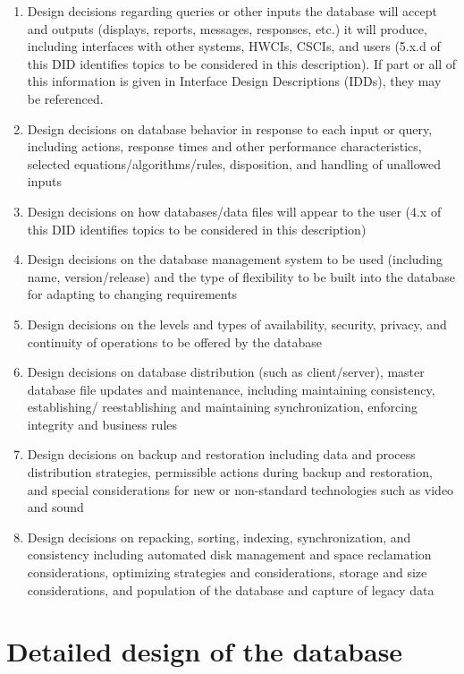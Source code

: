 \begin{enumerate}
\itemsep1pt\parskip0pt
\item
  Design decisions regarding queries or other inputs the database will
  accept and outputs (displays, reports, messages, responses, etc.) it
  will produce, including interfaces with other systems, HWCIs, CSCIs,
  and users (5.x.d of this DID identifies topics to be considered in
  this description). If part or all of this information is given in
  Interface Design Descriptions (IDDs), they may be referenced.
\item
  Design decisions on database behavior in response to each input or
  query, including actions, response times and other performance
  characteristics, selected equations/algorithms/rules, disposition, and
  handling of unallowed inputs
\item
  Design decisions on how databases/data files will appear to the user
  (4.x of this DID identifies topics to be considered in this
  description)
\item
  Design decisions on the database management system to be used
  (including name, version/release) and the type of flexibility to be
  built into the database for adapting to changing requirements
\item
  Design decisions on the levels and types of availability, security,
  privacy, and continuity of operations to be offered by the database
\item
  Design decisions on database distribution (such as client/server),
  master database file updates and maintenance, including maintaining
  consistency, establishing/ reestablishing and maintaining
  synchronization, enforcing integrity and business rules
\item
  Design decisions on backup and restoration including data and process
  distribution strategies, permissible actions during backup and
  restoration, and special considerations for new or non-standard
  technologies such as video and sound
\item
  Design decisions on repacking, sorting, indexing, synchronization, and
  consistency including automated disk management and space reclamation
  considerations, optimizing strategies and considerations, storage and
  size considerations, and population of the database and capture of
  legacy data
\end{enumerate}

\section{Detailed design of the database}

